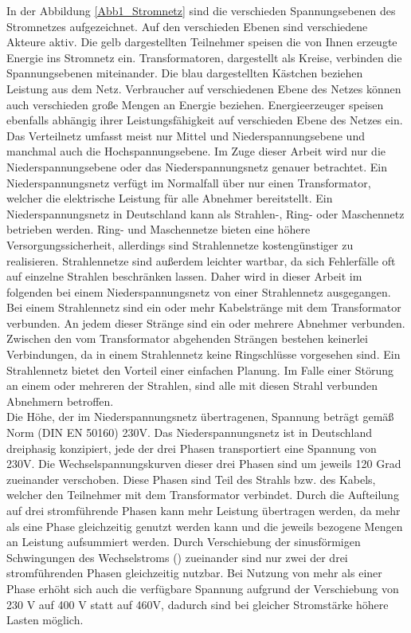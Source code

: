 In der Abbildung \ref{Abb1_Stromnetz} sind die verschieden Spannungsebenen des Stromnetzes aufgezeichnet. Auf den verschieden Ebenen sind verschiedene Akteure aktiv. Die gelb dargestellten Teilnehmer speisen die von Ihnen erzeugte Energie ins Stromnetz ein. Transformatoren, dargestellt als Kreise, verbinden die Spannungsebenen miteinander. Die blau dargestellten Kästchen beziehen Leistung aus dem Netz. Verbraucher auf verschiedenen Ebene des Netzes können auch verschieden große Mengen an Energie beziehen. Energieerzeuger speisen ebenfalls abhängig ihrer Leistungsfähigkeit auf verschieden Ebene des Netzes ein. Das Verteilnetz umfasst meist nur Mittel und Niederspannungsebene und manchmal auch die Hochspannungsebene. Im Zuge dieser Arbeit wird nur die Niederspannungsebene oder das Niederspannungsnetz genauer betrachtet. Ein Niederspannungsnetz verfügt im Normalfall über nur einen Transformator, welcher die elektrische Leistung für alle Abnehmer bereitstellt. Ein Niederspannungsnetz in Deutschland kann als Strahlen-, Ring- oder Maschennetz betrieben werden. Ring- und Maschennetze bieten eine höhere Versorgungssicherheit, allerdings sind Strahlennetze kostengünstiger zu realisieren. Strahlennetze sind außerdem leichter wartbar, da sich Fehlerfälle oft auf einzelne Strahlen beschränken lassen. Daher wird in dieser Arbeit im folgenden bei einem Niederspannungsnetz von einer Strahlennetz ausgegangen. Bei einem Strahlennetz sind ein oder mehr Kabelstränge mit dem Transformator verbunden. An jedem dieser Stränge sind ein oder mehrere Abnehmer verbunden. Zwischen den vom Transformator abgehenden Strängen bestehen keinerlei Verbindungen, da in einem Strahlennetz keine Ringschlüsse vorgesehen sind. Ein Strahlennetz bietet den Vorteil einer einfachen Planung. Im Falle einer Störung an einem oder mehreren der Strahlen, sind alle mit diesen Strahl verbunden Abnehmern betroffen.\\
Die Höhe, der im Niederspannungsnetz übertragenen, Spannung beträgt gemäß Norm (DIN EN 50160) 230V. Das Niederspannungsnetz ist in Deutschland dreiphasig konzipiert, jede der drei Phasen transportiert eine Spannung von 230V. Die Wechselspannungskurven dieser drei Phasen sind um jeweils 120 Grad zueinander verschoben. Diese Phasen sind Teil des Strahls bzw. des Kabels, welcher den Teilnehmer mit dem Transformator verbindet. Durch die Aufteilung auf drei stromführende Phasen kann mehr Leistung übertragen werden, da mehr als eine Phase  gleichzeitig genutzt werden kann und die jeweils bezogene Mengen an Leistung aufsummiert werden. Durch Verschiebung der sinusförmigen Schwingungen des Wechselstroms (\cite{strom_phasen}) zueinander sind nur zwei der drei stromführenden Phasen gleichzeitig nutzbar. Bei Nutzung von mehr als einer Phase erhöht sich auch die verfügbare Spannung aufgrund der Verschiebung von 230 V auf 400 V statt auf 460V, dadurch sind bei gleicher Stromstärke höhere Lasten möglich.



